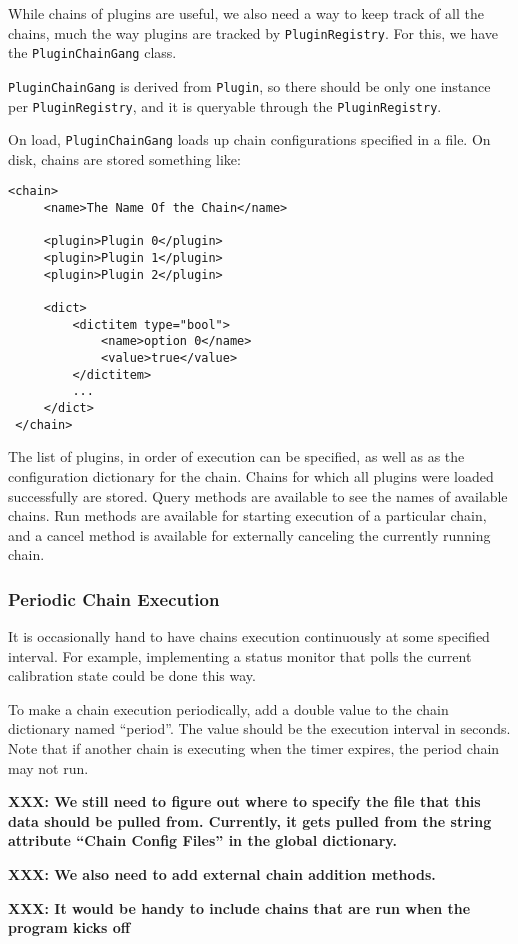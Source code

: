 While chains of plugins are useful, we also need a way to keep track of
all the chains, much the way plugins are tracked by {\tt PluginRegistry}.
For this, we have the {\tt PluginChainGang} class. 

{\tt PluginChainGang} is derived from {\tt Plugin}, so there should be
only one instance per {\tt PluginRegistry}, and it is queryable through
the {\tt PluginRegistry}.

On load, {\tt PluginChainGang} loads up chain configurations specified 
in a file. On disk, chains are stored something like:

\begin{lstlisting}[frame=single]
 <chain>
     <name>The Name Of the Chain</name>

     <plugin>Plugin 0</plugin>
     <plugin>Plugin 1</plugin>
     <plugin>Plugin 2</plugin>

     <dict>
         <dictitem type="bool">
             <name>option 0</name>
             <value>true</value>
         </dictitem>
         ...
     </dict>
 </chain>
\end{lstlisting}
The list of plugins, in order of execution can be specified, as well as 
as the configuration dictionary for the chain. Chains for which all plugins
were loaded successfully are stored. Query methods are available to see
the names of available chains. Run methods are available for starting
execution of a particular chain, and a cancel method is available for 
externally canceling the currently running chain.

\subsubsection{Periodic Chain Execution}

It is occasionally hand to have chains execution continuously at some
specified interval. For example, implementing a status monitor that polls
the current calibration state could be done this way. 

To make a chain execution periodically, add a double value to the chain
dictionary named ``period''. The value should be the execution interval
in seconds. Note that if another chain is executing when the timer 
expires, the period chain may not run.

{\bf XXX: We still need to figure out where to specify the file that this
data should be pulled from. Currently, it gets pulled from the string
attribute ``Chain Config Files'' in the global dictionary.}

{\bf XXX: We also need to add external chain addition methods.}

{\bf XXX: It would be handy to include chains that are run when the
          program kicks off}





